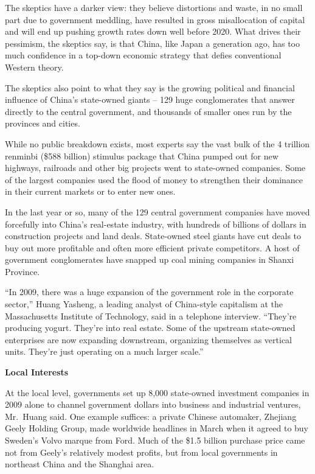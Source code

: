 ﻿\documentclass[12pt]{article}
\begin{document}
The skeptics have a darker view: they believe distortions and waste, in no small part due to
government meddling, have resulted in gross misallocation of capital and will end up pushing growth
rates down well before 2020. What drives their pessimism, the skeptics say, is that China, like
Japan a generation ago, has too much confidence in a top-down economic strategy that defies
conventional Western theory.

The skeptics also point to what they say is the growing political and financial influence of China's
state-owned giants -- 129 huge conglomerates that answer directly to the central government, and
thousands of smaller ones run by the provinces and cities.

While no public breakdown exists, most experts say the vast bulk of the 4 trillion renminbi (\$588
billion) stimulus package that China pumped out for new highways, railroads and other big projects
went to state-owned companies. Some of the largest companies used the flood of money to strengthen
their dominance in their current markets or to enter new ones.

In the last year or so, many of the 129 central government companies have moved forcefully into
China's real-estate industry, with hundreds of billions of dollars in construction projects and land
deals. State-owned steel giants have cut deals to buy out more profitable and often more efficient
private competitors. A host of government conglomerates have snapped up coal mining companies in
Shanxi Province.

``In 2009, there was a huge expansion of the government role in the corporate sector,'' Huang
Yasheng, a leading analyst of China-style capitalism at the Massachusetts Institute of Technology,
said in a telephone interview. ``They're producing yogurt. They're into real estate. Some of the
upstream state-owned enterprises are now expanding downstream, organizing themselves as vertical
units. They're just operating on a much larger scale.''

\textbf{Local Interests}

At the local level, governments set up 8,000 state-owned investment companies in 2009 alone to
channel government dollars into business and industrial ventures, Mr.~Huang said. One example
suffices: a private Chinese automaker, Zhejiang Geely Holding Group, made worldwide headlines in
March when it agreed to buy Sweden's Volvo marque from Ford. Much of the \$1.5 billion purchase
price came not from Geely's relatively modest profits, but from local governments in northeast China
and the Shanghai area.
\end{document}
